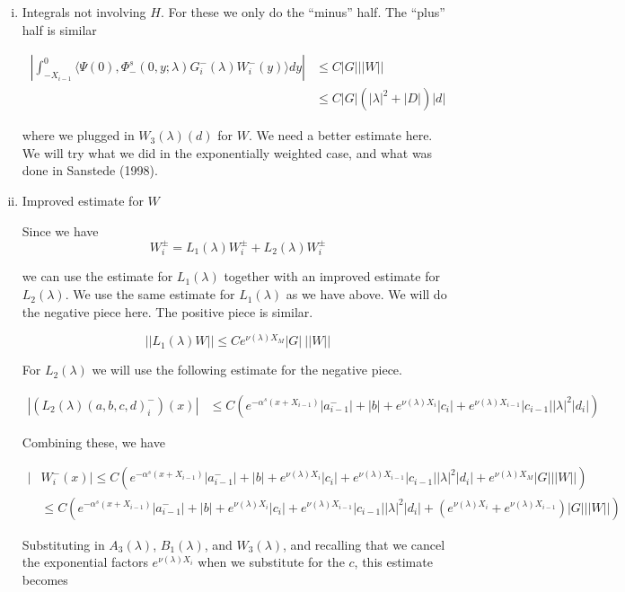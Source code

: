 \documentclass[12pt]{article}
\begin{document}
\begin{enumerate}
\begin{enumerate}[(i)]

\item Integrals not involving $H$. For these we only do the ``minus'' half. The ``plus'' half is similar

\begin{align*}
\left| \int_{-X_{i-1}}^0 \langle \Psi(0), \Phi^s_-(0, y; \lambda) G_i^-(\lambda)W_i^-(y) \rangle dy \right| 
&\leq C |G| ||W|| \\
&\leq C |G| ( |\lambda|^2 + |D|)|d|
\end{align*}

where we plugged in $W_3(\lambda)(d)$ for $W$. We need a better estimate here. We will try what we did in the exponentially weighted case, and what was done in Sanstede (1998).

\item Improved estimate for $W$

Since we have 
\[
W_i^\pm = L_1(\lambda)W_i^\pm + L_2(\lambda)W_i^\pm 
\]

we can use the estimate for $L_1(\lambda)$ together with an improved estimate for $L_2(\lambda)$. We use the same estimate for $L_1(\lambda)$ as we have above. We will do the negative piece here. The positive piece is similar.

\[
||L_1(\lambda)W|| \leq C e^{\nu(\lambda)X_M} |G| \: ||W||
\]

For $L_2(\lambda)$ we will use the following estimate for the negative piece.

\begin{align*}
| (L_2(\lambda)(a, b, c, d)_i^-)(x)| &\leq C \left( e^{-\alpha^s(x + X_{i-1})} |a^-_{i-1}| + |b| + e^{\nu(\lambda)X_i} |c_i| + e^{\nu(\lambda)X_{i-1}} |c_{i-1}| |\lambda|^2 |d_i| \right)
\end{align*}

Combining these, we have

\begin{align*}
| &W_i^-(x)| \leq C \left( e^{-\alpha^s(x + X_{i-1})} |a^-_{i-1}| + |b| + e^{\nu(\lambda)X_i} |c_i| + e^{\nu(\lambda)X_{i-1}} |c_{i-1}| |\lambda|^2 |d_i| + e^{\nu(\lambda)X_M} |G| ||W|| \right) \\
&\leq C \left( e^{-\alpha^s(x + X_{i-1})} |a^-_{i-1}| + |b| + e^{\nu(\lambda)X_i} |c_i| + e^{\nu(\lambda)X_{i-1}} |c_{i-1}| |\lambda|^2 |d_i| + (e^{\nu(\lambda)X_i} + e^{\nu(\lambda)X_{i-1}} )|G| ||W|| \right)
\end{align*}

Substituting in $A_3(\lambda)$, $B_1(\lambda)$, and $W_3(\lambda)$, and recalling that we cancel the exponential factors $e^{\nu(\lambda)X_i}$ when we substitute for the $c$, this estimate becomes


\end{enumerate}
\end{enumerate}
\end{document}

